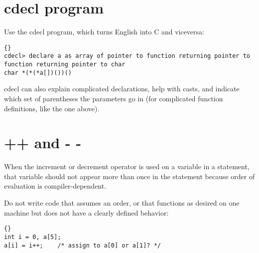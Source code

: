 \documentclass{report}
\begin{document}
\section{cdecl program}
Use the cdecl program, which turns English into C and viceversa:
\begin{lstlisting}{}
cdecl> declare a as array of pointer to function returning pointer to function returning pointer to char
char *(*(*a[])())()
\end{lstlisting}
cdecl can also explain complicated declarations, help with casts, and indicate which set of parentheses the parameters go in (for complicated function definitions, like the one above). 

\section{++ and - -} 
When the increment or decrement operator is used on a variable in a statement, that variable should not appear more than once in the statement because order of evaluation is compiler-dependent.

Do not write code that assumes an order, or that functions as desired on one machine but does not have a clearly defined behavior: 
\begin{lstlisting}{}
int i = 0, a[5];
a[i] = i++;    /* assign to a[0] or a[1]? */
\end{lstlisting}

\end{document}
